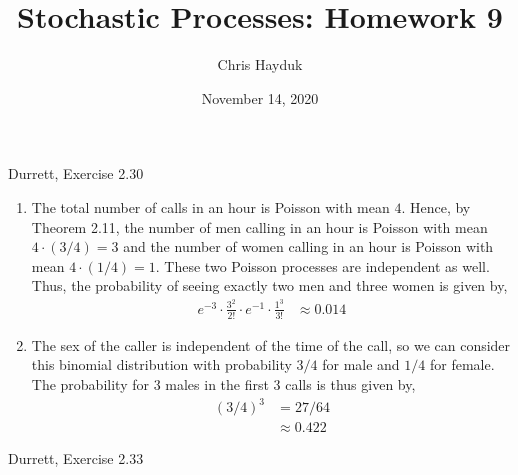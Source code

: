 \documentclass[12pt]{article}
\newenvironment{problem}[2][Problem]{\begin{trivlist}
\item[\hskip \labelsep {\bfseries #1}\hskip \labelsep {\bfseries #2.}]}{\end{trivlist}}
\begin{document}
\title{Stochastic Processes: Homework 9}

\author{Chris Hayduk}
\date{November 14, 2020}

\maketitle

\begin{problem}{1}
Durrett, Exercise 2.30
\end{problem}

\begin{enumerate}[label=(\alph*)]

\item The total number of calls in an hour is Poisson with mean $4$. Hence, by Theorem 2.11, the number of men calling in an hour is Poisson with mean $4 \cdot (3/4) = 3$ and the number of women calling in an hour is Poisson with mean $4 \cdot (1/4) = 1$. These two Poisson processes are independent as well. Thus, the probability of seeing exactly two men and three women is given by,
\begin{align*}
e^{-3} \cdot \frac{3^2}{2!} \cdot e^{-1} \cdot \frac{1^3}{3!} &\approx 0.014
\end{align*}

\item The sex of the caller is independent of the time of the call, so we can consider this binomial distribution with probability $3/4$ for male and $1/4$ for female. The probability for $3$ males in the first $3$ calls is thus given by,
\begin{align*}
(3/4)^3 &= 27/64\\
&\approx 0.422
\end{align*}

\end{enumerate}
\begin{problem}{2}
Durrett, Exercise 2.33
\end{problem}
\end{document}
